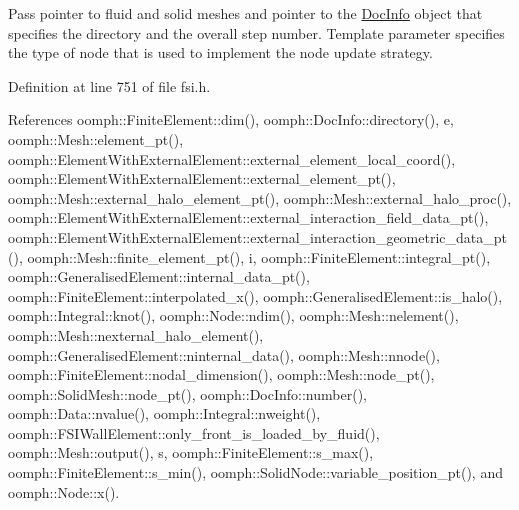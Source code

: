 Pass pointer to fluid and solid meshes and pointer to the \hyperlink{classoomph_1_1DocInfo}{Doc\+Info} object that specifies the directory and the overall step number. Template parameter specifies the type of node that is used to implement the node update strategy. 

Definition at line 751 of file fsi.\+h.



References oomph\+::\+Finite\+Element\+::dim(), oomph\+::\+Doc\+Info\+::directory(), e, oomph\+::\+Mesh\+::element\+\_\+pt(), oomph\+::\+Element\+With\+External\+Element\+::external\+\_\+element\+\_\+local\+\_\+coord(), oomph\+::\+Element\+With\+External\+Element\+::external\+\_\+element\+\_\+pt(), oomph\+::\+Mesh\+::external\+\_\+halo\+\_\+element\+\_\+pt(), oomph\+::\+Mesh\+::external\+\_\+halo\+\_\+proc(), oomph\+::\+Element\+With\+External\+Element\+::external\+\_\+interaction\+\_\+field\+\_\+data\+\_\+pt(), oomph\+::\+Element\+With\+External\+Element\+::external\+\_\+interaction\+\_\+geometric\+\_\+data\+\_\+pt(), oomph\+::\+Mesh\+::finite\+\_\+element\+\_\+pt(), i, oomph\+::\+Finite\+Element\+::integral\+\_\+pt(), oomph\+::\+Generalised\+Element\+::internal\+\_\+data\+\_\+pt(), oomph\+::\+Finite\+Element\+::interpolated\+\_\+x(), oomph\+::\+Generalised\+Element\+::is\+\_\+halo(), oomph\+::\+Integral\+::knot(), oomph\+::\+Node\+::ndim(), oomph\+::\+Mesh\+::nelement(), oomph\+::\+Mesh\+::nexternal\+\_\+halo\+\_\+element(), oomph\+::\+Generalised\+Element\+::ninternal\+\_\+data(), oomph\+::\+Mesh\+::nnode(), oomph\+::\+Finite\+Element\+::nodal\+\_\+dimension(), oomph\+::\+Mesh\+::node\+\_\+pt(), oomph\+::\+Solid\+Mesh\+::node\+\_\+pt(), oomph\+::\+Doc\+Info\+::number(), oomph\+::\+Data\+::nvalue(), oomph\+::\+Integral\+::nweight(), oomph\+::\+F\+S\+I\+Wall\+Element\+::only\+\_\+front\+\_\+is\+\_\+loaded\+\_\+by\+\_\+fluid(), oomph\+::\+Mesh\+::output(), s, oomph\+::\+Finite\+Element\+::s\+\_\+max(), oomph\+::\+Finite\+Element\+::s\+\_\+min(), oomph\+::\+Solid\+Node\+::variable\+\_\+position\+\_\+pt(), and oomph\+::\+Node\+::x().

\mbox{\label{namespaceoomph_1_1FSI__functions_a15e44de21e004a7aed5fd352fb3d8967}} 
